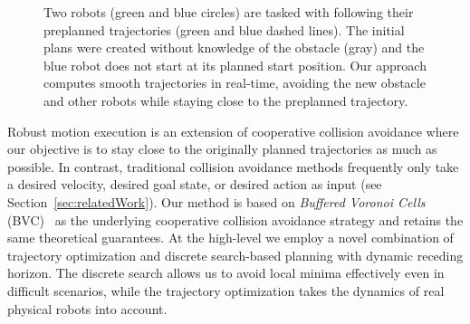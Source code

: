 \documentclass{svproc}
\begin{document}
\begin{figure}
\centering
{}
\hfill
{}
\caption{Two robots (green and blue circles) are tasked with following their preplanned trajectories (green and blue dashed lines).
The initial plans were created without knowledge of the obstacle (gray) and the blue robot does not start at its planned start position.
Our approach computes smooth trajectories in real-time, avoiding the new obstacle and other robots while staying close to the preplanned trajectory.
}
\label{fig:swap2}
\end{figure}

Robust motion execution is an extension of cooperative collision avoidance where our objective is to stay close to the originally planned trajectories as much as possible.
In contrast, traditional collision avoidance methods frequently only take a desired velocity, desired goal state, or desired action as input (see Section~\ref{sec:relatedWork}).
Our method is based on \emph{Buffered Voronoi Cells} (BVC)~\cite{bufferedVoronoiCells} as the underlying cooperative collision avoidance strategy and retains the same theoretical guarantees.
At the high-level we employ a novel combination of trajectory optimization and discrete search-based planning with dynamic receding horizon.
The discrete search allows us to avoid local minima effectively even in difficult scenarios, while the trajectory optimization takes the dynamics of real physical robots into account.
\end{document}
